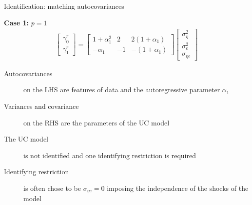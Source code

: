 \documentclass[notes,blackandwhite,mathsans,usenames,dvipsnames]{beamer}
\begin{document}
\begin{frame}{Identification: matching autocovariances}

\textbf{Case 1:} $p=1$ 
\begin{align*}
\begin{bmatrix} \gamma^r_0 \\ \gamma^r_1 \end{bmatrix} = 
\begin{bmatrix} 1+\alpha_1^2 & 2 & 2(1+\alpha_1) \\  -\alpha_1 & -1 & -(1+\alpha_1) \end{bmatrix}
\begin{bmatrix} \sigma^2_\eta \\ \sigma^2_e \\ \sigma_{\eta e} \end{bmatrix}
\end{align*}

\begin{description}
\item[Autocovariances] {\color{mcxs2}on the LHS are features of data and the autoregressive parameter} $\alpha_1$
\item[Variances and covariance] {\color{mcxs2}on the RHS are the parameters of the UC model}
\item[The UC model] {\color{mcxs2}is} {\color{purple}not identified} {\color{mcxs2}and one identifying restriction is required}
\item[Identifying restriction] {\color{mcxs2}is often chose to be} $\sigma_{\eta e}=0$ {\color{mcxs2}imposing the independence of the shocks of the model}
\end{description}

\end{frame}
\end{document}
